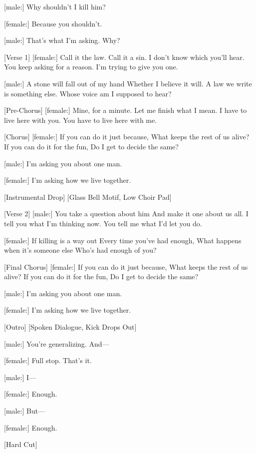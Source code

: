 \begin{lyrics}

[male:]
Why shouldn’t I kill him?

[female:]
Because you shouldn’t.

[male:]
That’s what I’m asking.
Why?

[Verse 1]
[female:]
Call it the law. Call it a sin.
I don’t know which you’ll hear.
You keep asking for a reason.
I’m trying to give you one.

[male:]
A stone will fall out of my hand
Whether I believe it will.
A law we write is something else.
Whose voice am I supposed to hear?

[Pre-Chorus]
[female:]
Mine, for a minute.
Let me finish what I mean.
I have to live here with you.
You have to live here with me.

[Chorus]
[female:]
If you can do it just because,
What keeps the rest of us alive?
If you can do it for the fun,
Do I get to decide the same?

[male:]
I’m asking you about one man.

[female:]
I’m asking how we live together.

[Instrumental Drop]
[Glass Bell Motif, Low Choir Pad]

[Verse 2]
[male:]
You take a question about him
And make it one about us all.
I tell you what I’m thinking now.
You tell me what I’d let you do.

[female:]
If killing is a way out
Every time you’ve had enough,
What happens when it’s someone else
Who’s had enough of you?

[Final Chorus]
[female:]
If you can do it just because,
What keeps the rest of us alive?
If you can do it for the fun,
Do I get to decide the same?

[male:]
I’m asking you about one man.

[female:]
I’m asking how we live together.

[Outro]
[Spoken Dialogue, Kick Drops Out]

[male:]
You’re generalizing. And—

[female:]
Full stop. That’s it.

[male:]
I—

[female:]
Enough.

[male:]
But—

[female:]
Enough.

[Hard Cut]
\end{lyrics}


